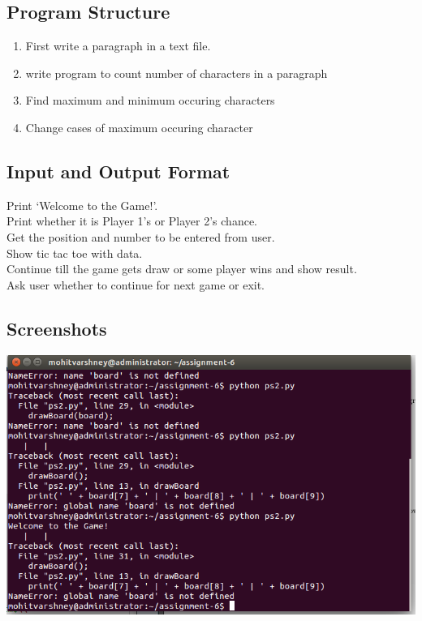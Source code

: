 \documentclass[12pt]{article}
\begin{document}
\subsection{Program Structure}
{
\begin{enumerate}
\item First write a paragraph in a text file.
\item write program to count number of characters in a paragraph
\item Find maximum and minimum occuring characters
\item Change cases of maximum occuring character 
\end{enumerate} 

}


\subsection{Input and Output Format}
{

Print ‘Welcome to the Game!’.    \\
Print whether it is Player 1’s or Player 2’s chance.\\
Get the position and number to be entered from user.\\
Show     tic tac toe with data.\\
Continue till the game gets draw or some player wins and show result.\\
Ask user whether to continue for next game or exit.\\


}







\subsection{Screenshots}
{
\begin{center}
    \vspace*{0.5 cm}
 \includegraphics[width=0.9\linewidth]{ps2.png}\\[1.0 cm]
\end{center}    
}
\end{document}
